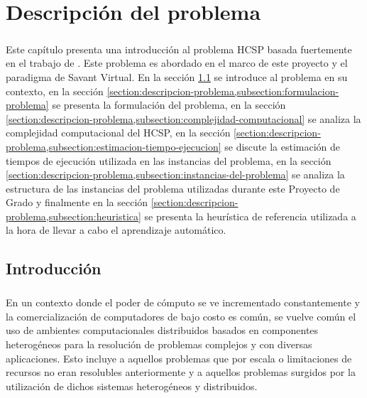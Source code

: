 \chapter{Descripción del problema} \label{section-descripcion-problema}

\paragraph{}Este capítulo presenta una introducción al problema HCSP basada fuertemente en el trabajo de \citet{bib-doctorado-nesmachnow}. Este problema es abordado en el marco de este proyecto y el paradigma de Savant Virtual. En la sección \ref{section:descripcion-problema,subsection:introduccion} se introduce al problema en su contexto, en la sección \ref{section:descripcion-problema,subsection:formulacion-problema} se presenta la formulación del problema, en la sección \ref{section:descripcion-problema,subsection:complejidad-computacional} se analiza la complejidad computacional del HCSP, en la sección \ref{section:descripcion-problema,subsection:estimacion-tiempo-ejecucion} se discute la estimación de tiempos de ejecución utilizada en las instancias del problema, en la sección \ref{section:descripcion-problema,subsection:instancias-del-problema} se analiza la estructura de las instancias del problema utilizadas durante este Proyecto de Grado y finalmente en la sección \ref{section:descripcion-problema,subsection:heuristica} se
presenta la heurística de referencia utilizada a la hora de llevar a cabo el aprendizaje automático.

\section{Introducción} \label{section:descripcion-problema,subsection:introduccion}

 
\paragraph{}En un contexto donde el poder de cómputo se ve incrementado constantemente y la comercialización de computadores de bajo costo es común, se vuelve común el uso de ambientes computacionales distribuidos basados en componentes heterogéneos para la resolución de problemas complejos y con diversas aplicaciones. Esto incluye a aquellos problemas que por escala o limitaciones de recursos no eran resolubles anteriormente y a aquellos problemas surgidos por la utilización de dichos sistemas heterogéneos y distribuidos. 

